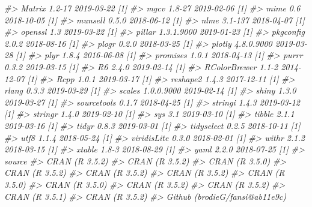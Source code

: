 \documentclass[
  12pt,
]{krantz}
\newenvironment{Shaded}{\begin{snugshade}}{\end{snugshade}}
\newcommand{\CommentTok}[1]{\textcolor[rgb]{0.56,0.35,0.01}{\textit{#1}}}
\begin{document}
\begin{Shaded}
\begin{Highlighting}[]
\CommentTok{#>  Matrix         1.2-17     2019-03-22 [1]}
\CommentTok{#>  mgcv           1.8-27     2019-02-06 [1]}
\CommentTok{#>  mime           0.6        2018-10-05 [1]}
\CommentTok{#>  munsell        0.5.0      2018-06-12 [1]}
\CommentTok{#>  nlme           3.1-137    2018-04-07 [1]}
\CommentTok{#>  openssl        1.3        2019-03-22 [1]}
\CommentTok{#>  pillar         1.3.1.9000 2019-01-23 [1]}
\CommentTok{#>  pkgconfig      2.0.2      2018-08-16 [1]}
\CommentTok{#>  plogr          0.2.0      2018-03-25 [1]}
\CommentTok{#>  plotly         4.8.0.9000 2019-03-28 [1]}
\CommentTok{#>  plyr           1.8.4      2016-06-08 [1]}
\CommentTok{#>  promises       1.0.1      2018-04-13 [1]}
\CommentTok{#>  purrr          0.3.2      2019-03-15 [1]}
\CommentTok{#>  R6             2.4.0      2019-02-14 [1]}
\CommentTok{#>  RColorBrewer   1.1-2      2014-12-07 [1]}
\CommentTok{#>  Rcpp           1.0.1      2019-03-17 [1]}
\CommentTok{#>  reshape2       1.4.3      2017-12-11 [1]}
\CommentTok{#>  rlang          0.3.3      2019-03-29 [1]}
\CommentTok{#>  scales         1.0.0.9000 2019-02-14 [1]}
\CommentTok{#>  shiny          1.3.0      2019-03-27 [1]}
\CommentTok{#>  sourcetools    0.1.7      2018-04-25 [1]}
\CommentTok{#>  stringi        1.4.3      2019-03-12 [1]}
\CommentTok{#>  stringr        1.4.0      2019-02-10 [1]}
\CommentTok{#>  sys            3.1        2019-03-10 [1]}
\CommentTok{#>  tibble         2.1.1      2019-03-16 [1]}
\CommentTok{#>  tidyr          0.8.3      2019-03-01 [1]}
\CommentTok{#>  tidyselect     0.2.5      2018-10-11 [1]}
\CommentTok{#>  utf8           1.1.4      2018-05-24 [1]}
\CommentTok{#>  viridisLite    0.3.0      2018-02-01 [1]}
\CommentTok{#>  withr          2.1.2      2018-03-15 [1]}
\CommentTok{#>  xtable         1.8-3      2018-08-29 [1]}
\CommentTok{#>  yaml           2.2.0      2018-07-25 [1]}
\CommentTok{#>  source                               }
\CommentTok{#>  CRAN (R 3.5.2)                       }
\CommentTok{#>  CRAN (R 3.5.2)                       }
\CommentTok{#>  CRAN (R 3.5.0)                       }
\CommentTok{#>  CRAN (R 3.5.2)                       }
\CommentTok{#>  CRAN (R 3.5.2)                       }
\CommentTok{#>  CRAN (R 3.5.2)                       }
\CommentTok{#>  CRAN (R 3.5.0)                       }
\CommentTok{#>  CRAN (R 3.5.0)                       }
\CommentTok{#>  CRAN (R 3.5.2)                       }
\CommentTok{#>  CRAN (R 3.5.2)                       }
\CommentTok{#>  CRAN (R 3.5.1)                       }
\CommentTok{#>  CRAN (R 3.5.2)                       }
\CommentTok{#>  Github (brodieG/fansi@ab11e9c)       }

\end{Highlighting}
\end{Shaded}
\end{document}
